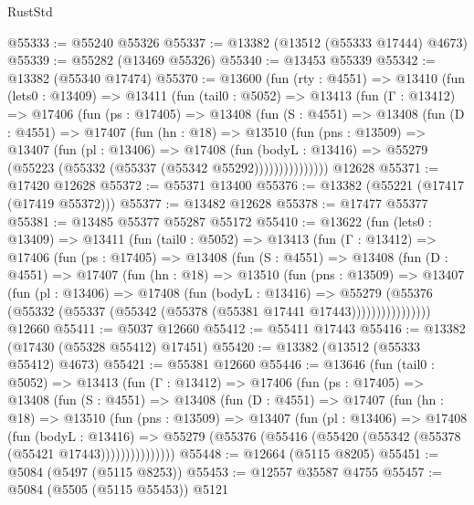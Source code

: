 \begin{lexlean}{RustStd}
\begin{coremodule}
@55333 := @55240 @55326
@55337 := @13382 (@13512 (@55333 @17444) @4673)
@55339 := @55282 (@13469 @55326)
@55340 := @13453 @55339
@55342 := @13382 (@55340 @17474)
@55370 := @13600
    (fun (rty : @4551) =>
    @13410
      (fun (lets0 : @13409) =>
      @13411
        (fun (tail0 : @5052) =>
        @13413
          (fun (Γ : @13412) =>
          @17406
            (fun (ps : @17405) =>
            @13408
              (fun (S : @4551) =>
              @13408
                (fun (D : @4551) =>
                @17407
                  (fun (hn : @18) =>
                  @13510
                    (fun (pns : @13509) =>
                    @13407
                      (fun (pl : @13406) =>
                      @17408
                        (fun (bodyL : @13416) =>
                        @55279 (@55223 (@55332 (@55337 (@55342 @55292)))))))))))))))
    @12628
@55371 := @17420 @12628
@55372 := @55371 @13400
@55376 := @13382 (@55221 (@17417 (@17419 @55372)))
@55377 := @13482 @12628
@55378 := @17477 @55377
@55381 := @13485 @55377 @55287 @55172
@55410 := @13622
    (fun (lets0 : @13409) =>
    @13411
      (fun (tail0 : @5052) =>
      @13413
        (fun (Γ : @13412) =>
        @17406
          (fun (ps : @17405) =>
          @13408
            (fun (S : @4551) =>
            @13408
              (fun (D : @4551) =>
              @17407
                (fun (hn : @18) =>
                @13510
                  (fun (pns : @13509) =>
                  @13407
                    (fun (pl : @13406) =>
                    @17408
                      (fun (bodyL : @13416) =>
                      @55279
                        (@55376
                          (@55332 (@55337 (@55342 (@55378 (@55381 @17441 @17443))))))))))))))))
    @12660
@55411 := @5037 @12660
@55412 := @55411 @17443
@55416 := @13382 (@17430 (@55328 @55412) @17451)
@55420 := @13382 (@13512 (@55333 @55412) @4673)
@55421 := @55381 @12660
@55446 := @13646
    (fun (tail0 : @5052) =>
    @13413
      (fun (Γ : @13412) =>
      @17406
        (fun (ps : @17405) =>
        @13408
          (fun (S : @4551) =>
          @13408
            (fun (D : @4551) =>
            @17407
              (fun (hn : @18) =>
              @13510
                (fun (pns : @13509) =>
                @13407
                  (fun (pl : @13406) =>
                  @17408
                    (fun (bodyL : @13416) =>
                    @55279 (@55376 (@55416 (@55420 (@55342 (@55378 (@55421 @17443)))))))))))))))
@55448 := @12664 (@5115 @8205)
@55451 := @5084 (@5497 (@5115 @8253))
@55453 := @12557 @35587 @4755
@55457 := @5084 (@5505 (@5115 @55453)) @5121

\end{coremodule}
\end{lexlean}
